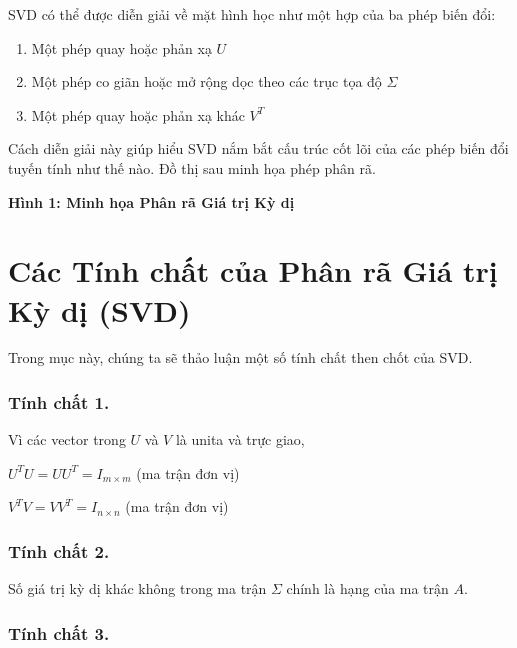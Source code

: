 SVD có thể được diễn giải về mặt hình học như một hợp của ba phép biến đổi:
\begin{enumerate}
  \item Một phép quay hoặc phản xạ $U$
  \item Một phép co giãn hoặc mở rộng dọc theo các trục tọa độ $\Sigma$
  \item Một phép quay hoặc phản xạ khác $V^{T}$
\end{enumerate}

Cách diễn giải này giúp hiểu SVD nắm bắt cấu trúc cốt lõi của các phép biến đổi tuyến tính như thế nào. Đồ thị sau minh họa phép phân rã.

\textbf{Hình 1: Minh họa Phân rã Giá trị Kỳ dị}

\begin{figure}[H]
\centering
{}
\end{figure}

\section{Các Tính chất của Phân rã Giá trị Kỳ dị (SVD)}

Trong mục này, chúng ta sẽ thảo luận một số tính chất then chốt của SVD.

\subsubsection*{Tính chất 1.}

Vì các vector trong $U$ và $V$ là unita và trực giao,

$U^{T}U=UU^{T}=I_{m\times m}$ \quad (ma trận đơn vị)

$V^{T}V=VV^{T}=I_{n\times n}$ \quad (ma trận đơn vị)

\subsubsection*{Tính chất 2.}

Số giá trị kỳ dị khác không trong ma trận $\Sigma$ chính là hạng của ma trận $A$.

\subsubsection*{Tính chất 3.}

